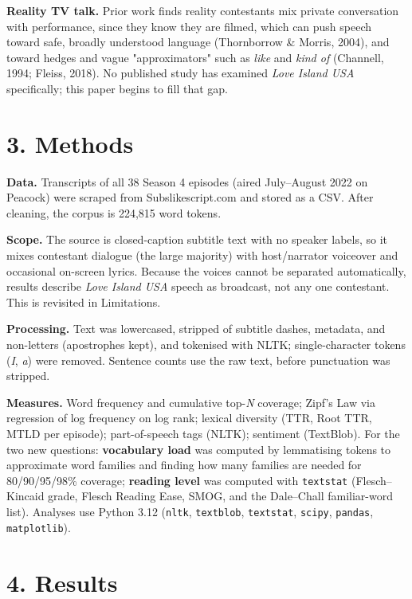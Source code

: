 \documentclass[11pt]{article}
\begin{document}
\textbf{Reality TV talk.} Prior work finds reality contestants mix private conversation with performance, since they know they are filmed, which can push speech toward safe, broadly understood language (Thornborrow \& Morris, 2004), and toward hedges and vague "approximators" such as \emph{like} and \emph{kind of} (Channell, 1994; Fleiss, 2018). No published study has examined \emph{Love Island USA} specifically; this paper begins to fill that gap.


\section*{3. Methods}

\textbf{Data.} Transcripts of all 38 Season 4 episodes (aired July--August 2022 on Peacock) were scraped from Subslikescript.com and stored as a CSV. After cleaning, the corpus is 224,815 word tokens.

\textbf{Scope.} The source is closed-caption subtitle text with no speaker labels, so it mixes contestant dialogue (the large majority) with host/narrator voiceover and occasional on-screen lyrics. Because the voices cannot be separated automatically, results describe \emph{Love Island USA} speech as broadcast, not any one contestant. This is revisited in Limitations.

\textbf{Processing.} Text was lowercased, stripped of subtitle dashes, metadata, and non-letters (apostrophes kept), and tokenised with NLTK; single-character tokens (\emph{I}, \emph{a}) were removed. Sentence counts use the raw text, before punctuation was stripped.

\textbf{Measures.} Word frequency and cumulative top-\emph{N} coverage; Zipf's Law via regression of log frequency on log rank; lexical diversity (TTR, Root TTR, MTLD per episode); part-of-speech tags (NLTK); sentiment (TextBlob). For the two new questions: \textbf{vocabulary load} was computed by lemmatising tokens to approximate word families and finding how many families are needed for 80/90/95/98\% coverage; \textbf{reading level} was computed with \texttt{textstat} (Flesch--Kincaid grade, Flesch Reading Ease, SMOG, and the Dale--Chall familiar-word list). Analyses use Python 3.12 (\texttt{nltk}, \texttt{textblob}, \texttt{textstat}, \texttt{scipy}, \texttt{pandas}, \texttt{matplotlib}).


\section*{4. Results}
\end{document}
